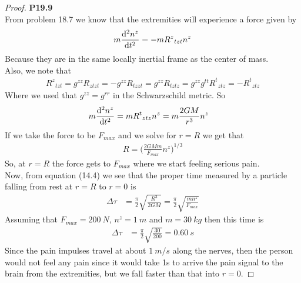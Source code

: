 \documentclass[11pt]{article}
\theoremstyle{definition}
\begin{document}
\cleardoublepage
\begin{proof}{\textbf{P19.9}}\\
From problem 18.7 we know that the extremities will experience a force given by
\begin{align*}
    m\dv[2]{n^z}{t} = -m{R^z}_{tzt} n^z
\end{align*}
Because they are in the same locally inertial frame as the center of mass.
\\
Also, we note that
\begin{align*}
    {R^z}_{tzt} = g^{zz}R_{ztzt} = -g^{zz}R_{tzzt} =
    g^{zz}R_{tztz} = g^{zz}g^{tt}{R^t}_{ztz} = -{R^t}_{ztz}
\end{align*}
Where we used that $g^{zz} = g^{rr}$ in the Schwarzschild metric. So
\begin{align*}
    m\dv[2]{n^z}{t} &= m{R^t}_{ztz} n^z
    = m\frac{2GM}{r^3} n^z
\end{align*}
If we take the force to be $F_{max}$ and we solve for $r = R$ we get that 
\begin{align*}
    R = \bigg(\frac{2GMm}{F_{max}}n^z\bigg)^{1/3}
\end{align*}
So, at $r = R$ the force gets to $F_{max}$ where we start feeling serious pain.
\\
Now, from equation (14.4) we see that the proper time measured by a particle 
falling from rest at $r = R$ to $r = 0$ is
\begin{align*}
    \Delta \tau &= \frac{\pi}{2}\sqrt{\frac{R^3}{2GM}}
    = \frac{\pi}{2}\sqrt{\frac{mn^z}{F_{max}}}
\end{align*}
Assuming that $F_{max} = 200~N$, $n^z = 1~m$ and $m = 30~kg$ then this time is
\begin{align*}
    \Delta \tau 
    &= \frac{\pi}{2}\sqrt{\frac{30}{200}} = 0.60~s
\end{align*}
Since the pain impulses travel at about $1~m/s$ along the nerves, then the
person would not feel any pain since it would take 1s to arrive the pain signal
to the brain from the extremities, but we fall faster than that into $r = 0$. 
\end{proof}
\end{document}
